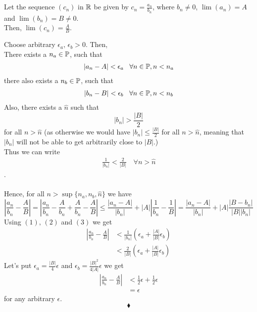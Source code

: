 \subsection{}
\begin{tcolorbox}
Let the sequence $(c_n)$ in $\mathbb{R}$ be given by $c_n = \frac{a_n}{b_n}$, where $b_n\neq 0$,  $\lim (a_n)= A$ and $\lim (b_n)= B\neq 0$.\\
 Then, $\lim (c_n)= \frac{A}{B}$.
\end{tcolorbox}
Choose arbitrary $\epsilon_a,\,\epsilon_b>  0$. Then, \\ There exists a $n_a \in \mathbb{P}$, such that \begin{align}|a_n - A| < \epsilon_a \,\,\,\ \forall n\in\mathbb{P}, n<n_a\end{align}
there also exists a $n_b \in \mathbb{P}$, such that  \begin{align}|b_n - B| <\epsilon_b \,\,\,\ \forall n\in\mathbb{P}, n< n_b\end{align}
Also, there exists  a $\hat{n}$ such that
$$ |b_n|> \frac{|B|}{2} $$
for all $n > \hat{n}$ (as otherwise we would have $|b_n|\leq \frac{|B|}{2}$ for all $n > \hat{n}$, meaning that $|b_n|$ will not be able to get arbitrarily close to $|B|$.)\\
Thus we can write 
\begin{align}
\frac{1}{|b_n|}< \frac{2}{|B|}\quad \forall n > \hat{n}
\end{align}.\\\\
 Hence, for all  $n > \sup\{n_a,n_b,\hat{n}\}$ we have 
$$\left|\frac{a_n}{b_n} - \frac{A}{B}\right| = \left|\frac{a_n}{b_n}-\frac{A}{b_n}+\frac{A}{b_n} - \frac{A}{B}\right|\leq\frac{|a_n-A|}{|b_n|} +|A|\left|\frac{1}{b_n}-\frac{1}{B} \right|=\frac{|a_n-A|}{|b_n|} +|A|\frac{|B-b_n|}{|B| |b_n|}$$ Using $(1),\, (2)$ and $(3)$ we get 
\begin{align}
\left|\frac{a_n}{b_n} - \frac{A}{B}\right|&<  \frac{1}{|b_n|}\left(\epsilon_a + \frac{|A|}{|B|}\epsilon_b\right)\\
&<    \frac{2}{|B|}\left(\epsilon_a + \frac{|A|}{|B|}\epsilon_b\right)
 \end{align}
 Let's put $\epsilon_a = \frac{|B|}{4}\epsilon$ and $\epsilon_b = \frac{|B|^2}{4|A|}\epsilon$  we get 
\begin{align*}
\left|\frac{a_n}{b_n} - \frac{A}{B}\right|&<  \frac{1}{2}\epsilon+ \frac{1}{2}\epsilon\\
&=\epsilon 
\end{align*}
for any arbitrary $\epsilon$.
$$\blacklozenge$$
\newpage
